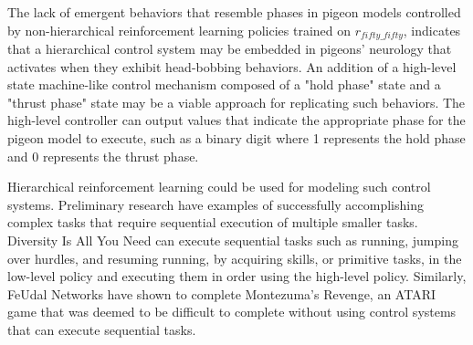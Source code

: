   The lack of emergent behaviors that resemble phases in pigeon models controlled by non-hierarchical reinforcement learning policies trained on $r_{fifty\_fifty}$, indicates that a hierarchical control system may be embedded in pigeons' neurology that activates when they exhibit head-bobbing behaviors.
  An addition of a high-level state machine-like control mechanism composed of a "hold phase" state and a "thrust phase" state may be a viable approach for replicating such behaviors.
  The high-level controller can output values that indicate the appropriate phase for the pigeon model to execute, such as a binary digit where 1 represents the hold phase and 0 represents the thrust phase.

  Hierarchical reinforcement learning could be used for modeling such control systems.
  Preliminary research have examples of successfully accomplishing complex tasks that require sequential execution of multiple smaller tasks.
  Diversity Is All You Need \cite{eysenbach2018diversity} can execute sequential tasks such as running, jumping over hurdles, and resuming running, by acquiring skills, or primitive tasks, in the low-level policy and executing them in order using the high-level policy.
  Similarly, FeUdal Networks \cite{vezhnevets2017feudal} have shown to complete Montezuma's Revenge, an ATARI game that was deemed to be difficult to complete without using control systems that can execute sequential tasks.

